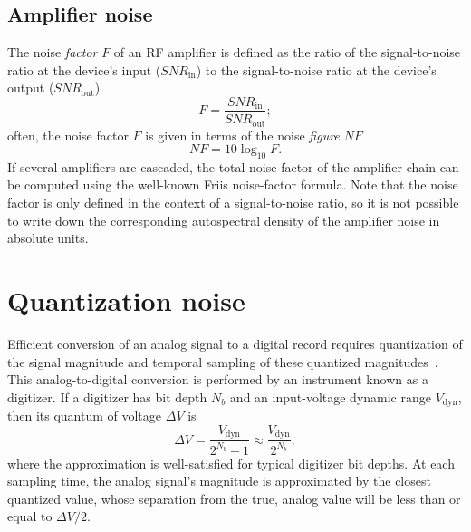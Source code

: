 \subsection{Amplifier noise}
The noise \emph{factor} $F$ of an RF amplifier is defined as the ratio of
the signal-to-noise ratio at the device's input ($SNR_{\text{in}}$) to
the signal-to-noise ratio at the device's output ($SNR_{\text{out}}$)
\begin{equation}
  F = \frac{SNR_{\text{in}}}{SNR_{\text{out}}};
\end{equation}
often, the noise factor $F$ is given
in terms of the noise \emph{figure} $NF$
\cite{minicircuits_amplifier_terms_defined}
\begin{equation}
  NF = 10 \log_{10} F.
\end{equation}
If several amplifiers are cascaded,
the total noise factor of the amplifier chain
can be computed using the well-known Friis noise-factor formula.
Note that the noise factor is only defined
in the context of a signal-to-noise ratio, so
it is not possible to write down the corresponding
autospectral density of the amplifier noise in absolute units.


\section{Quantization noise}
Efficient conversion of an analog signal to a digital record requires
quantization of the signal magnitude and
temporal sampling of these quantized magnitudes~\cite{bennett_bstj48}.
This analog-to-digital conversion
is performed by an instrument known as a digitizer.
If a digitizer has bit depth $N_b$ and
an input-voltage dynamic range $V_{\text{dyn}}$,
then its quantum of voltage $\Delta V$ is
\begin{equation}
  \Delta V
  =
  \frac{V_{\text{dyn}}}{2^{N_b} - 1}
  \approx
  \frac{V_{\text{dyn}}}{2^{N_b}},
  \label{eq:DesignConsiderations:digitizer_voltage_quantum}
\end{equation}
where the approximation is well-satisfied
for typical digitizer bit depths.
At each sampling time,
the analog signal's magnitude is approximated
by the closest quantized value, whose
separation from the true, analog value
will be less than or equal to $\Delta V / 2$.

